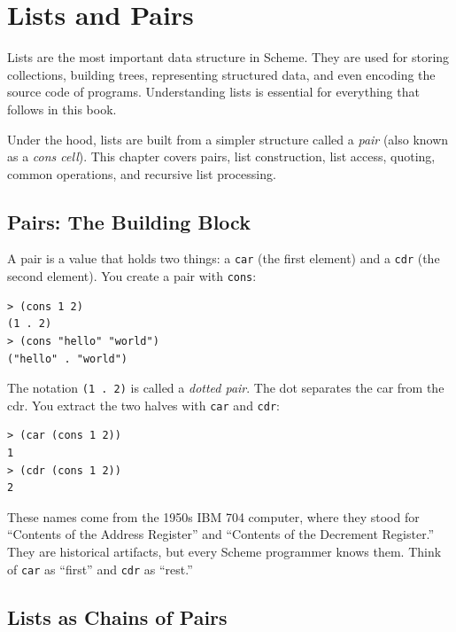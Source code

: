 \chapter{Lists and Pairs}
\label{ch:lists}

Lists are the most important data structure in Scheme. They are used for storing collections, building trees, representing structured data, and even encoding the source code of programs. Understanding lists is essential for everything that follows in this book.

Under the hood, lists are built from a simpler structure called a \emph{pair} (also known as a \emph{cons cell}). This chapter covers pairs, list construction, list access, quoting, common operations, and recursive list processing.

\section{Pairs: The Building Block}

A pair is a value that holds two things: a \texttt{car} (the first element) and a \texttt{cdr} (the second element). You create a pair with \texttt{cons}:

\begin{lstlisting}[style=repl]
> (cons 1 2)
(1 . 2)
> (cons "hello" "world")
("hello" . "world")
\end{lstlisting}

The notation \texttt{(1 . 2)} is called a \emph{dotted pair}. The dot separates the car from the cdr. You extract the two halves with \texttt{car} and \texttt{cdr}:

\begin{lstlisting}[style=repl]
> (car (cons 1 2))
1
> (cdr (cons 1 2))
2
\end{lstlisting}

\begin{note}
These names come from the 1950s IBM 704 computer, where they stood for ``Contents of the Address Register'' and ``Contents of the Decrement Register.'' They are historical artifacts, but every Scheme programmer knows them. Think of \texttt{car} as ``first'' and \texttt{cdr} as ``rest.''
\end{note}

\section{Lists as Chains of Pairs}

